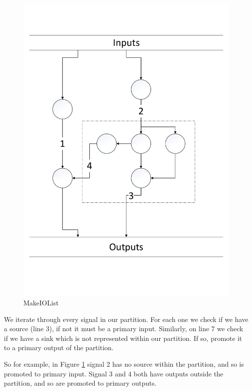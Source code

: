 \documentclass[12pt,final,oneside]{dwThesis} %
\begin{document}
   \begin{figure}

      \begin{center}

         \includegraphics[width=\linewidth]{images/MakeIOList.pdf}
         \caption{MakeIOList} \label{imMakeiolist} 
      \end{center}

   \end{figure}
   We
   iterate through every signal in our partition. For each one we check if we
   have a source (line 3), if not it must be a primary input. Similarly, on
   line 7 we check if we have a sink which is not represented within our
   partition. If so, promote it to a primary output of the partition.

   So for example, in Figure \ref{imMakeiolist} signal 2 has no source within
   the partition, and so is promoted to primary input. Signal 3 and 4 both have
   outputs outside the partition, and so are promoted to primary outputs.
\end{document}
